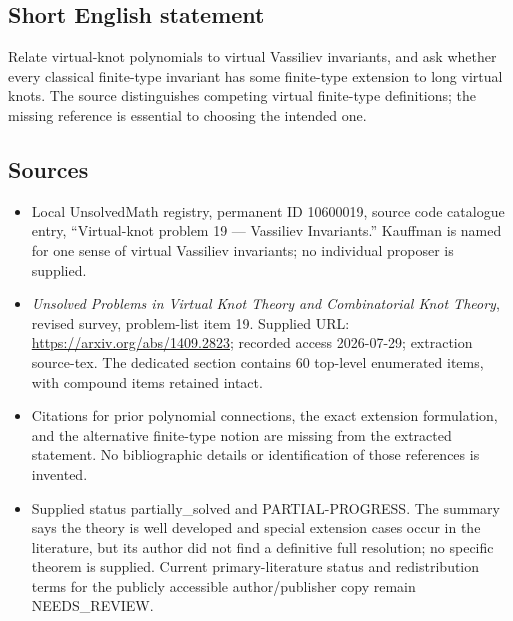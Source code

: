\documentclass[11pt]{article}
\begin{document}
\subsection{Short English statement}
Relate virtual-knot polynomials to virtual Vassiliev invariants, and ask whether every classical finite-type invariant has some finite-type extension to long virtual knots. The source distinguishes competing virtual finite-type definitions; the missing reference is essential to choosing the intended one.
\subsection{Sources}
\begin{itemize}
\item Local UnsolvedMath registry, permanent ID 10600019, source code catalogue entry, ``Virtual-knot problem 19 --- Vassiliev Invariants.'' Kauffman is named for one sense of virtual Vassiliev invariants; no individual proposer is supplied.
\item \emph{Unsolved Problems in Virtual Knot Theory and Combinatorial Knot Theory}, revised survey, problem-list item 19. Supplied URL: \url{https://arxiv.org/abs/1409.2823}; recorded access 2026-07-29; extraction source-tex. The dedicated section contains 60 top-level enumerated items, with compound items retained intact.
\item Citations for prior polynomial connections, the exact extension formulation, and the alternative finite-type notion are missing from the extracted statement. No bibliographic details or identification of those references is invented.
\item Supplied status partially\_solved and PARTIAL-PROGRESS. The summary says the theory is well developed and special extension cases occur in the literature, but its author did not find a definitive full resolution; no specific theorem is supplied. Current primary-literature status and redistribution terms for the publicly accessible author/publisher copy remain NEEDS\_REVIEW.
\end{itemize}
\end{document}
